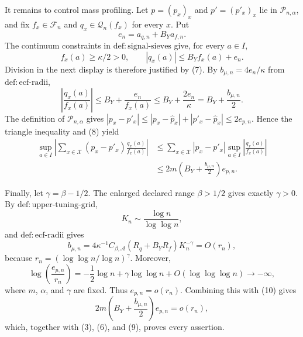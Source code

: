 It remains to control mass profiling.  Let \(p=(p_x)_x\) and \(p'=(p'_x)_x\) lie in \(\mathcal P_{n,\alpha}\), and fix \(f_x\in\mathscr F_n\) and \(q_x\in\mathscr Q_n(f_x)\) for every \(x\).  Put
\[
 e_n=a_{q,n}+B_Ya_{f,n}.
\]
The continuum constraints in \(\mathrm{def{:}signal\text{-}sieves}\) give, for every \(a\in I\),
\[
 f_x(a)\ge\kappa/2>0,
 \qquad |q_x(a)|\le B_Yf_x(a)+e_n.                                  \tag{7}
\]
Division in the next display is therefore justified by (7).  By
\(b_{\mu,n}=4e_n/\kappa\) from \(\mathrm{def{:}ecf\text{-}radii}\),
\[
 \left|\frac{q_x(a)}{f_x(a)}\right|
 \le B_Y+\frac{e_n}{f_x(a)}
 \le B_Y+\frac{2e_n}{\kappa}
 =B_Y+\frac{b_{\mu,n}}2.                                            \tag{8}
\]
The definition of \(\mathcal P_{n,\alpha}\) gives
\(|p_x-p'_x|\le|p_x-\widehat p_x|+|p'_x-\widehat p_x|\le2e_{p,n}\).
Hence the triangle inequality and (8) yield
\[
 \begin{aligned}
 \sup_{a\in I}\left|
 \sum_{x\in\mathcal X}(p_x-p'_x)\frac{q_x(a)}{f_x(a)}
 \right|
 &\le\sum_{x\in\mathcal X}|p_x-p'_x|
       \sup_{a\in I}\left|\frac{q_x(a)}{f_x(a)}\right|\\
 &\le2m\left(B_Y+\frac{b_{\mu,n}}2\right)e_{p,n}.                 \tag{9}
 \end{aligned}
\]

Finally, let \(\gamma=\beta-1/2\).  The enlarged declared range \(\beta>1/2\) gives exactly \(\gamma>0\).  By \(\mathrm{def{:}upper\text{-}tuning\text{-}grid}\),
\[
 K_n\sim\frac{\log n}{\log\log n},
\]
and \(\mathrm{def{:}ecf\text{-}radii}\) gives
\[
 b_{\mu,n}
 =4\kappa^{-1}C_{\beta,\mathcal A}(R_q+B_YR_f)K_n^{-\gamma}
 =O(r_n),                                                            \tag{10}
\]
because \(r_n=(\log\log n/\log n)^\gamma\).  Moreover,
\[
 \log\left(\frac{e_{p,n}}{r_n}\right)
 =-\frac12\log n+\gamma\log\log n+O(\log\log\log n)
 \longrightarrow-\infty,                                          \tag{11}
\]
where \(m\), \(\alpha\), and \(\gamma\) are fixed.  Thus \(e_{p,n}=o(r_n)\).  Combining this with (10) gives
\[
 2m\left(B_Y+\frac{b_{\mu,n}}2\right)e_{p,n}=o(r_n),               \tag{12}
\]
which, together with (3), (6), and (9), proves every assertion.
